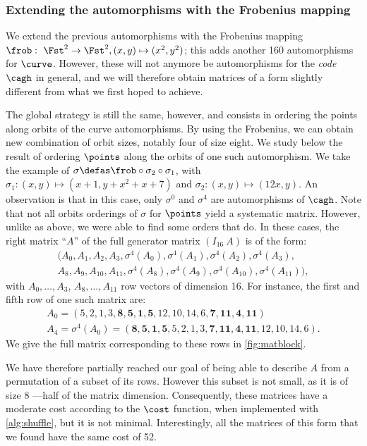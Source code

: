 \subsubsection{Extending the automorphisms with the Frobenius mapping} We extend the previous automorphisms with the
Frobenius mapping $\frob:~\Fst^2 \rightarrow \Fst^2,\linebreak(x, y) \mapsto (x^2,y^2)$; this adds another 160 automorphisms for $\curve$. However, these will not anymore be
automorphisms for the \emph{code} $\cagh$ in general, and we will therefore obtain matrices of a form slightly different from what we first hoped to achieve.

The global strategy is still the same, however, and consists in ordering the points along orbits of the curve automorphisms.
By using the Frobenius, we can obtain new combination of orbit sizes, notably four of size eight.
We study below the result of ordering $\points$
along the orbits of one such automorphism. We take the example of $\sigma \defas \frob \circ \sigma_2 \circ \sigma_1$, with
$\sigma_1 : (x,y) \mapsto (x + 1, y + x^2 + x + 7)$ and
$\sigma_2 : (x,y) \mapsto (12x, y)$. An observation is that in this case, only $\sigma^0$ and $\sigma^4$ are automorphisms of $\cagh$.
Note that not all orbits orderings of $\sigma$ for $\points$ yield a systematic matrix. However, unlike as above, we were able to find some orders
that do. In these cases, the right matrix ``$A$'' of the full generator matrix $(I_{16}~A)$ is of the form:
\[
\begin{aligned}
(A_0, A_1, A_2, A_3, \sigma^4(A_0), \sigma^4(A_1), \sigma^4(A_2), \sigma^4(A_3),\\
A_8, A_9, A_{10}, A_{11}, \sigma^4(A_8), \sigma^4(A_9), \sigma^4(A_{10}), \sigma^4(A_{11})),
\end{aligned}
\]
with $A_0,\ldots, A_3$, $A_8,\ldots, A_{11}$ row vectors of dimension 16. For instance, the first and fifth row of one such matrix are:
\[
	\begin{aligned}
	A_0 =(5, 2, 1, 3, \mathbf{8, 5, 1, 5}, 12, 10, 14, 6, \mathbf{7, 11, 4, 11})\\
	A_4 = \sigma^4(A_0) = (\mathbf{8, 5, 1, 5}, 5, 2, 1, 3, \mathbf{7, 11, 4, 11}, 12, 10, 14, 6).
	\end{aligned}
\]
We give the full matrix corresponding to these rows in \autoref{fig:matblock}.

We have therefore partially reached our goal of being able to describe $A$ from a permutation of a subset of its rows. However this subset
is not small, as it is of size 8 ---half
of the matrix dimension. Consequently, these matrices have a moderate cost according to the $\cost$ function, when implemented with \autoref{alg:shuffle}, but it is not minimal. Interestingly, all the matrices of this form
that we found have the same cost of 52.

